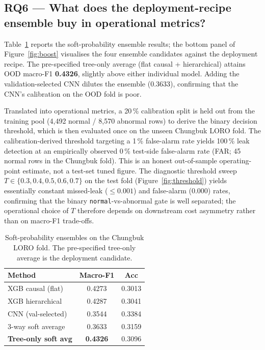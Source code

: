 \documentclass[3p,times,authoryear]{elsarticle}
\theoremstyle{remark}
\begin{document}
\subsection{RQ6 --- What does the deployment-recipe ensemble buy in operational metrics?}\label{sec:res-rq6}

Table~\ref{tab:ensemble} reports the soft-probability ensemble
results; the bottom panel of Figure~\ref{fig:boost} visualises
the four ensemble candidates against the deployment recipe. The
pre-specified tree-only average (flat causal + hierarchical)
attains OOD macro-F1 \textbf{0.4326}, slightly above either
individual model. Adding the validation-selected CNN dilutes
the ensemble (0.3633), confirming that the CNN's calibration
on the OOD fold is poor.

Translated into operational metrics, a 20\,\% calibration split
is held out from the training pool (4{,}492 normal / 8{,}570
abnormal rows) to derive the binary decision threshold, which
is then evaluated once on the unseen Chungbuk LORO fold. The
calibration-derived threshold targeting a 1\,\% false-alarm
rate yields 100\,\% leak detection at an empirically observed
0\,\% test-side false-alarm rate (FAR; 45 normal rows in the
Chungbuk fold). This is an honest out-of-sample operating-point
estimate, not a test-set tuned figure. The diagnostic
threshold sweep $T \in \{0.3, 0.4, 0.5, 0.6, 0.7\}$ on the test
fold (Figure~\ref{fig:threshold}) yields essentially constant
missed-leak ($\leq 0.001$) and false-alarm (0.000) rates,
confirming that the binary \texttt{normal}-vs-abnormal gate is
well separated; the operational choice of $T$ therefore depends
on downstream cost asymmetry rather than on macro-F1
trade-offs.

\begin{table}[!htbp]
\caption{Soft-probability ensembles on the Chungbuk LORO fold.
The pre-specified tree-only average is the deployment
candidate.\label{tab:ensemble}}
\centering
\small
\setlength{\tabcolsep}{6pt}
\begin{tabular}{lcc}
\toprule
Method & Macro-F1 & Acc \\
\midrule
XGB causal (flat)          & 0.4273 & 0.3013 \\
XGB hierarchical           & 0.4287 & 0.3041 \\
CNN (val-selected)         & 0.3544 & 0.3384 \\
3-way soft average         & 0.3633 & 0.3159 \\
\textbf{Tree-only soft avg} & \textbf{0.4326} & 0.3096 \\
\bottomrule
\end{tabular}
\end{table}
\end{document}
